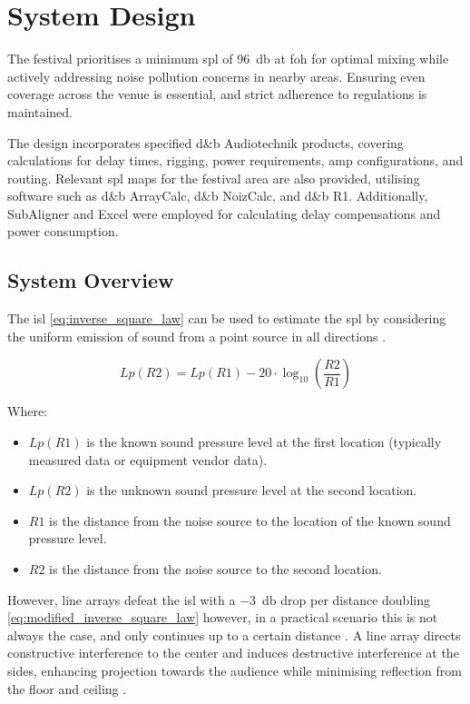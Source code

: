 \section{System Design}   
    The festival prioritises a minimum \acrshort{spl} of \SI{96}{\decibel} at \acrshort{foh} for optimal mixing while actively addressing noise pollution concerns in nearby areas. Ensuring even coverage across the venue is essential, and strict adherence to regulations is maintained.

    The design incorporates specified d\&b Audiotechnik products, covering calculations for delay times, rigging, power requirements, amp configurations, and routing. Relevant \acrshort{spl} maps for the festival area are also provided, utilising software such as d\&b ArrayCalc, d\&b NoizCalc, and d\&b R1. Additionally, SubAligner and Excel were employed for calculating delay compensations and power consumption.
    
    \subsection{System Overview}
    The \acrfull{isl} \eqref{eq:inverse_square_law} can be used to estimate the \acrshort{spl} by considering the uniform emission of sound from a point source in all directions \citep{wkc2023}.

    \begin{equation}\label{eq:inverse_square_law}
        Lp(R2) = Lp(R1) - 20 \cdot \log_{10}\left(\frac{R2}{R1}\right)
    \end{equation}
        
    Where:
    \begin{itemize}
        \item $Lp(R1)$ is the known sound pressure level at the first location (typically measured data or equipment vendor data).
        \item $Lp(R2)$ is the unknown sound pressure level at the second location.
        \item $R1$ is the distance from the noise source to the location of the known sound pressure level.
        \item $R2$ is the distance from the noise source to the second location.
    \end{itemize}

    However, line arrays defeat the \acrshort{isl} with a \SI{-3}{\decibel} drop per distance doubling \citep{brown2010} \eqref{eq:modified_inverse_square_law} however, in a practical scenario this is not always the case, and only continues up to a certain distance \citep{dstewart2016}. A line array directs constructive interference to the center and induces destructive interference at the sides, enhancing projection towards the audience while minimising reflection from the floor and ceiling \citep{dmellor2006}.

